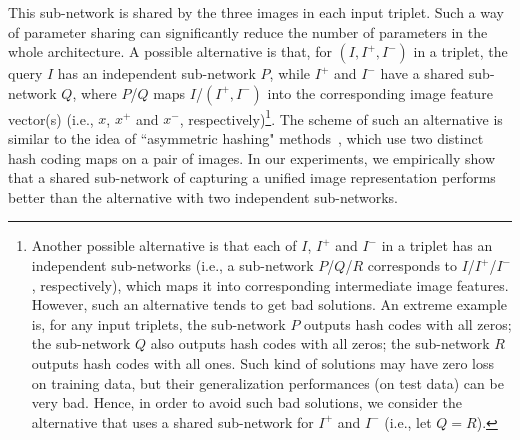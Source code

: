 \documentclass[10pt,twocolumn,letterpaper]{article}
\begin{document}
This sub-network is shared by the three images in each input
triplet. Such a way of parameter sharing can significantly reduce
the number of parameters in the whole architecture. A possible
alternative is that, for $(I,I^+,I^-)$ in a triplet, the query $I$
has an independent sub-network $P$, while $I^+$ and $I^-$ have a shared
sub-network $Q$, where $P$/$Q$ maps $I$/$(I^+,I^-)$ into
the corresponding image feature vector(s) (i.e., $x$, $x^+$ and
$x^-$, respectively)\footnote{Another possible alternative is that each of
$I$, $I^+$ and $I^-$ in a triplet has an independent sub-networks
(i.e., a sub-network $P$/$Q$/$R$ corresponds to $I$/$I^+$/$I^-$,
respectively), which maps it into corresponding intermediate image features.
However, such an alternative tends to get bad solutions. An extreme
example is, for any input triplets, the sub-network $P$ outputs hash
codes with all zeros; the sub-network $Q$ also outputs hash codes
with all zeros; the sub-network $R$ outputs hash codes with all
ones. Such kind of solutions may have zero loss on training data,
but their generalization performances (on test data) can be very
bad. Hence, in order to avoid such bad solutions, we consider the alternative that uses a shared sub-network for $I^+$ and $I^-$ (i.e., let $Q=R$).}. The scheme of such an alternative is similar to the idea of
``asymmetric hashing" methods~\cite{asymmetryhash}, which use two distinct hash coding
maps on a pair of images. In our experiments, we empirically show
that a shared sub-network of capturing a unified image
representation performs better than the alternative with two
independent sub-networks.


\end{document}
